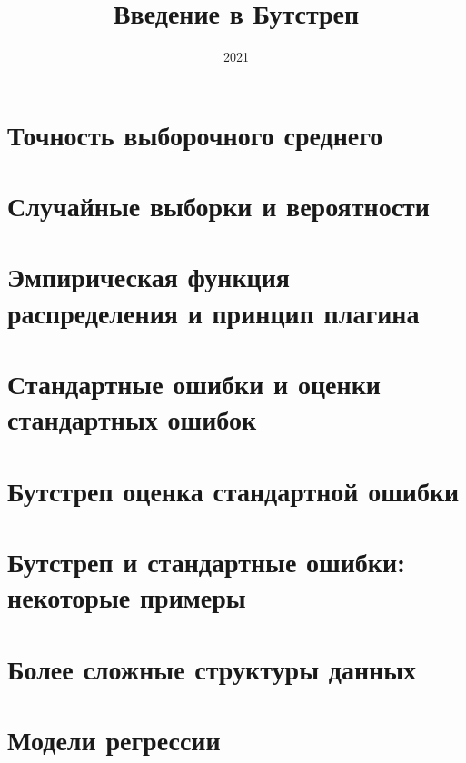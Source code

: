 \documentclass[12pt,a4paper,final]{report}
\title{Введение в Бутстреп}
\date{2021}
\begin{document}
\maketitle

\tableofcontents

\chapter{Точность выборочного среднего }


\chapter{Случайные выборки и вероятности}




\chapter{Эмпирическая функция распределения и принцип плагина}




\chapter{Стандартные ошибки и оценки стандартных ошибок}




\chapter{Бутстреп оценка стандартной ошибки}






\chapter{Бутстреп и стандартные ошибки: некоторые примеры}





\setcounter{chapter}{7}
\chapter{Более сложные структуры данных}








\chapter{Модели регрессии}








\end{document}
